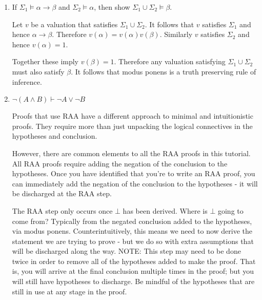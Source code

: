 \documentclass[11pt]{report}
\begin{document}
\begin{enumerate}
	\item If $\Sigma_{1} \models \alpha \to \beta$ and $\Sigma_{2} \models \alpha$, then show $\Sigma_{1} \cup \Sigma_{2} \models \beta$.
	
	\hspace{0.2cm}{\bf Solution}
	
	Let $v$ be a valuation that satisfies $\Sigma_{1} \cup \Sigma_{2}$. It follows that $v$ satisfies $\Sigma_{1}$ and hence $\alpha \to \beta$. Therefore $v(\alpha) = v(\alpha)v(\beta)$. Similarly $v$ satisfies $\Sigma_{2}$ and hence $v(\alpha) = 1$. 

	Together these imply $v(\beta) = 1$. Therefore any valuation satisfying $\Sigma_{1} \cup \Sigma_{2}$ must also satisfy $\beta$. It follows that modus ponens is a truth preserving rule of inference. 

	
	\newpage
	\item $\lnot (A \land B) \vdash \lnot A \lor \lnot B$

	\hspace{0.2cm}{\bf Solution}

	Proofs that use RAA have a different approach to minimal and intuitionistic proofs. They require more than just unpacking the logical connectives in the hypotheses and conclusion. 

	However, there are common elements to all the RAA proofs in this tutorial. All RAA proofs require adding the negation of the conclusion to the hypotheses. Once you have identified that you're to write an RAA proof, you can immediately add the negation of the conclusion to the hypotheses - it will be discharged at the RAA step. 

	The RAA step only occurs once $\bot$ has been derived. Where is $\bot$ going to come from? Typically from the negated conclusion added to the hypotheses, via modus ponens. Counterintuitively, this means we need to now derive the statement we are trying to prove - but we do so with extra assumptions that will be discharged along the way. NOTE: This step may need to be done twice in order to remove all of the hypotheses added to make the proof. That is, you will arrive at the final conclusion multiple times in the proof; but you will still have hypotheses to discharge. Be mindful of the hypotheses that are still in use at any stage in the proof. 


\end{enumerate}
\end{document}
